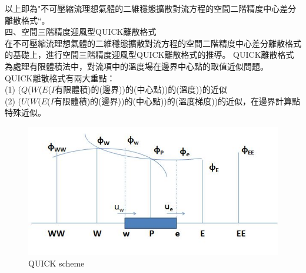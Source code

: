 \documentclass[12pt]{article}
\begin{document}
以上即為"不可壓縮流理想氣體的二維穩態擴散對流方程的空間二階精度中心差分離散格式“。\\
\newpage
\noindent 四、空間三階精度迎風型QUICK離散格式\\

在不可壓縮流理想氣體的二維穩態擴散對流方程的空間二階精度中心差分離散格式的基礎上，進行空間三階精度迎風型QUICK離散格式的推導。
\noindent QUICK離散格式為處理有限體積法中，對流項中的溫度場在邊界中心點的取值近似問題。\\

\noindent QUICK離散格式有兩大重點：\\
\noindent  (1) ($Q$($W$($E$($I$有限體積)的(邊界))的(中心點))的(溫度))的近似\\
\noindent  (2) ($U$($W$($E$($I$有限體積)的(邊界))的(中心點))的(溫度梯度))的近似，在邊界計算點特殊近似。\\
\begin{figure}[H]
  \centering
  \includegraphics[scale = 0.5]{3.jpg}
  \caption{QUICK scheme}
  \label{fig:QUICK}
\end{figure}
\end{document}
